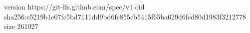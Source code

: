 version https://git-lfs.github.com/spec/v1
oid sha256:e5219b1c07fc5bd7111dd9bd6fc855cb5415f65ba629d6fcd80d1983f3212778
size 261027

